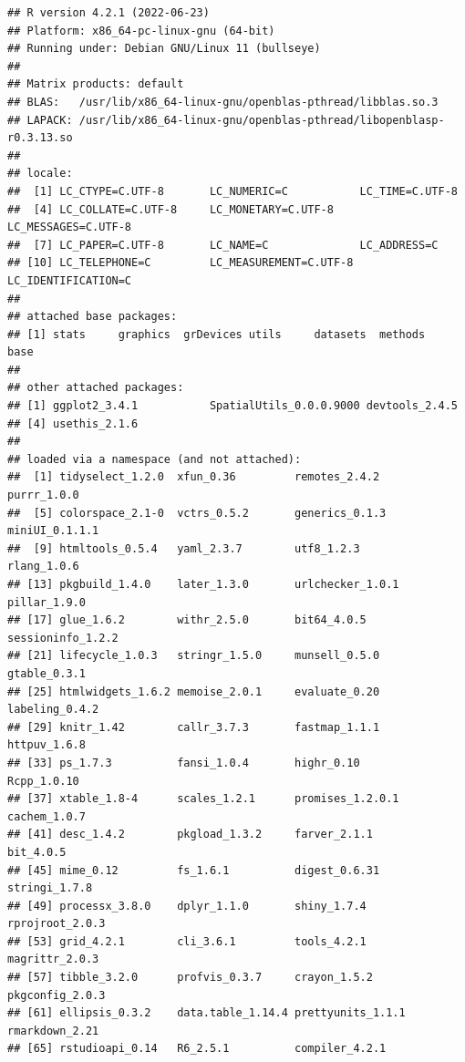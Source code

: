 \documentclass[
]{article}
\begin{document}
\begin{verbatim}
## R version 4.2.1 (2022-06-23)
## Platform: x86_64-pc-linux-gnu (64-bit)
## Running under: Debian GNU/Linux 11 (bullseye)
## 
## Matrix products: default
## BLAS:   /usr/lib/x86_64-linux-gnu/openblas-pthread/libblas.so.3
## LAPACK: /usr/lib/x86_64-linux-gnu/openblas-pthread/libopenblasp-r0.3.13.so
## 
## locale:
##  [1] LC_CTYPE=C.UTF-8       LC_NUMERIC=C           LC_TIME=C.UTF-8       
##  [4] LC_COLLATE=C.UTF-8     LC_MONETARY=C.UTF-8    LC_MESSAGES=C.UTF-8   
##  [7] LC_PAPER=C.UTF-8       LC_NAME=C              LC_ADDRESS=C          
## [10] LC_TELEPHONE=C         LC_MEASUREMENT=C.UTF-8 LC_IDENTIFICATION=C   
## 
## attached base packages:
## [1] stats     graphics  grDevices utils     datasets  methods   base     
## 
## other attached packages:
## [1] ggplot2_3.4.1           SpatialUtils_0.0.0.9000 devtools_2.4.5         
## [4] usethis_2.1.6          
## 
## loaded via a namespace (and not attached):
##  [1] tidyselect_1.2.0  xfun_0.36         remotes_2.4.2     purrr_1.0.0      
##  [5] colorspace_2.1-0  vctrs_0.5.2       generics_0.1.3    miniUI_0.1.1.1   
##  [9] htmltools_0.5.4   yaml_2.3.7        utf8_1.2.3        rlang_1.0.6      
## [13] pkgbuild_1.4.0    later_1.3.0       urlchecker_1.0.1  pillar_1.9.0     
## [17] glue_1.6.2        withr_2.5.0       bit64_4.0.5       sessioninfo_1.2.2
## [21] lifecycle_1.0.3   stringr_1.5.0     munsell_0.5.0     gtable_0.3.1     
## [25] htmlwidgets_1.6.2 memoise_2.0.1     evaluate_0.20     labeling_0.4.2   
## [29] knitr_1.42        callr_3.7.3       fastmap_1.1.1     httpuv_1.6.8     
## [33] ps_1.7.3          fansi_1.0.4       highr_0.10        Rcpp_1.0.10      
## [37] xtable_1.8-4      scales_1.2.1      promises_1.2.0.1  cachem_1.0.7     
## [41] desc_1.4.2        pkgload_1.3.2     farver_2.1.1      bit_4.0.5        
## [45] mime_0.12         fs_1.6.1          digest_0.6.31     stringi_1.7.8    
## [49] processx_3.8.0    dplyr_1.1.0       shiny_1.7.4       rprojroot_2.0.3  
## [53] grid_4.2.1        cli_3.6.1         tools_4.2.1       magrittr_2.0.3   
## [57] tibble_3.2.0      profvis_0.3.7     crayon_1.5.2      pkgconfig_2.0.3  
## [61] ellipsis_0.3.2    data.table_1.14.4 prettyunits_1.1.1 rmarkdown_2.21   
## [65] rstudioapi_0.14   R6_2.5.1          compiler_4.2.1
\end{verbatim}
\end{document}
